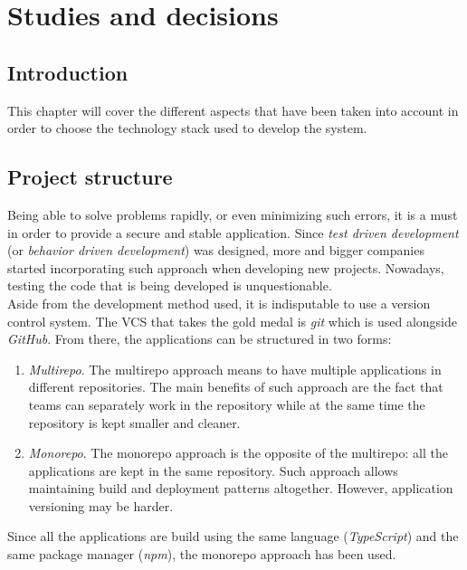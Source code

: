 \documentclass[a4paper, 12pt, oneside]{book}
\begin{document}
\chapter{Studies and decisions}
\section{Introduction}
This chapter will cover the different aspects that have been taken into account in order to choose the technology stack used to develop the system.
\section{Project structure}
Being able to solve problems rapidly, or even minimizing such errors, it is a must in order to provide a secure and stable application. Since \emph{test driven development} (or \emph{behavior driven development}) was designed, more and bigger companies started incorporating such approach when developing new projects. Nowadays, testing the code that is being developed is unquestionable.
\\[8pt]
Aside from the development method used, it is indisputable to use a version control system. The VCS that takes the gold medal is \emph{git} which is used alongside \emph{GitHub}. From there, the applications can be structured in two forms:
\begin{enumerate}[label = -]
	\item \emph{Multirepo}. The multirepo approach means to have multiple applications in different repositories. The main benefits of such approach are the fact that teams can separately work in the repository while at the same time the repository is kept smaller and cleaner.
	\item \emph{Monorepo}. The monorepo approach is the opposite of the multirepo: all the applications are kept in the same repository. Such approach allows maintaining build and deployment patterns altogether. However, application versioning may be harder.
\end{enumerate}
Since all the applications are build using the same language (\emph{TypeScript}) and the same package manager (\emph{npm}), the monorepo approach has been used.
\end{document}
